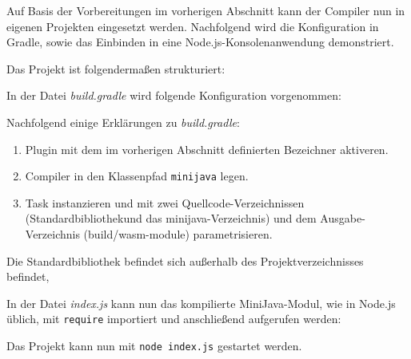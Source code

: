 Auf Basis der Vorbereitungen im vorherigen Abschnitt kann der Compiler nun in eigenen Projekten eingesetzt werden. Nachfolgend wird die Konfiguration in Gradle, sowie das Einbinden in eine Node.js-Konsolenanwendung demonstriert.

Das Projekt ist folgendermaßen strukturiert:



In der Datei \emph{build.gradle} wird folgende Konfiguration vorgenommen:



Nachfolgend einige Erklärungen zu \emph{build.gradle}:
\begin{enumerate}
    \item Plugin mit dem im vorherigen Abschnitt definierten Bezeichner aktiveren.
    \item Compiler in den Klassenpfad \lstinline{minijava} legen.
    \item Task instanzieren und mit zwei Quellcode-Verzeichnissen (Standardbibliothekund das minijava-Verzeichnis) und dem Ausgabe-Verzeichnis (build/wasm-module) parametrisieren.
\end{enumerate}

Die Standardbibliothek befindet sich außerhalb des Projektverzeichnisses befindet, 

In der Datei \emph{index.js} kann nun das kompilierte MiniJava-Modul, wie in Node.js üblich, mit \lstinline{require} importiert und anschließend aufgerufen werden:



Das Projekt kann nun mit \lstinline{node index.js} gestartet werden.
